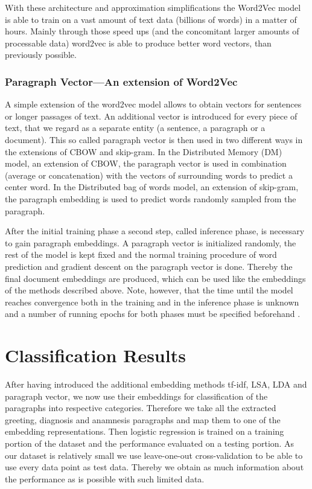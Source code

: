 With these architecture and approximation simplifications the Word2Vec
model is able to train on a vast amount of text data (billions of
words) in a matter of hours. Mainly through those speed ups (and the concomitant larger amounts of processable data) word2vec is able to produce better word vectors, than previously possible.

\subsubsection*{Paragraph Vector---An extension of Word2Vec}

A simple extension of the word2vec model allows to obtain vectors
for sentences or longer passages of text. An additional vector is
introduced for every piece of text, that we regard as a separate entity
(a sentence, a paragraph or a document). This so called paragraph
vector is then used in two different ways in the extensions of CBOW
and skip-gram. In the Distributed Memory (DM) model, an extension
of CBOW, the paragraph vector is used in combination (average or concatenation)
with the vectors of surrounding words to predict a center word. In
the Distributed bag of words model, an extension of skip-gram, the
paragraph embedding is used to predict words randomly sampled from
the paragraph.

After the initial training phase a second step, called inference phase, is necessary to gain paragraph embeddings. A paragraph vector is initialized randomly, the rest of the model is kept fixed and the normal training procedure of word prediction and gradient descent on the paragraph vector is done. Thereby the final document embeddings are produced, which can be used like the embeddings of the methods described above. Note, however, that the time until the model reaches convergence both in the training and in the inference phase is unknown and a number of running epochs for both phases must be specified beforehand \citep{Le2014}.





\section*{Classification Results}

After having introduced the additional embedding methods tf-idf, LSA, LDA and paragraph vector, we now use their embeddings for classification of the paragraphs into respective categories. Therefore we take all the extracted greeting, diagnosis and anamnesis paragraphs and map them to one of the embedding representations. Then logistic regression is trained on a training portion of the dataset and the performance evaluated on a testing portion. As our dataset is relatively small we use leave-one-out cross-validation to be able to use every data point as test data. Thereby we obtain as much information about the performance as is possible with such limited data.

